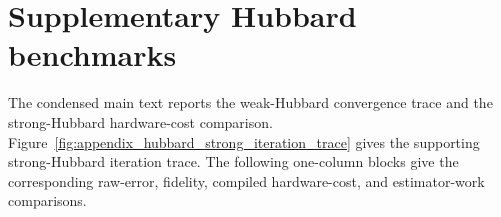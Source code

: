 \documentclass[
  reprint,
  amsmath,
  amssymb,
  aps,
  pra,
  nofootinbib,
  superscriptaddress,
  floatfix
]{revtex4-2}
\begin{document}
\section{Supplementary Hubbard benchmarks}
\label{app:supplementary_transfer_benchmarks}


The condensed main text reports the weak-Hubbard convergence trace and the strong-Hubbard hardware-cost comparison. Figure~\ref{fig:appendix_hubbard_strong_iteration_trace} gives the supporting strong-Hubbard iteration trace. The following one-column blocks give the corresponding raw-error, fidelity, compiled hardware-cost, and estimator-work comparisons.

\end{document}
